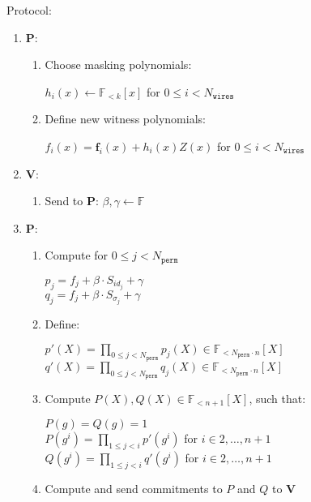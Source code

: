 Protocol:
\begin{enumerate}
	\item \textbf{P}:
	\begin{enumerate}
		\item Choose masking polynomials: 
		\begin{center}
			$h_i(x) \leftarrow \mathbb{F}_{<k}[x]$ for $0 \leq i < N_{\texttt{wires}}$
		\end{center}
		\item Define new witness polynomials:
		\begin{center}
			$f_i(x) = \textbf{f}_{i}(x) + h_i(x)Z(x)$ for $0 \leq i < N_{\texttt{wires}}$
		\end{center}
	\end{enumerate}
	\item \textbf{V}:
	\begin{enumerate}
		\item Send to \textbf{P}: $\beta, \gamma \leftarrow \mathbb{F}$
	\end{enumerate}
	\item \textbf{P}:
	\begin{enumerate}
		\item Compute for $0 \leq j < N_{\texttt{perm}}$
		\begin{center}
			$p_j = f_j + \beta \cdot S_{id_j} + \gamma$ \\
			$q_j = f_j + \beta \cdot S_{\sigma_j} + \gamma$
		\end{center}
		\item Define:
		\begin{center}
			$p'(X) = \prod\limits_{0 \leq j < N_{\texttt{perm}}} p_j(X) \in \mathbb{F}_{<N_{\texttt{perm}} \cdot n}[X]$ \\
			$q'(X) = \prod\limits_{0 \leq j < N_{\texttt{perm}}} q_j(X) \in \mathbb{F}_{<N_{\texttt{perm}} \cdot n}[X]$
		\end{center}
		\item Compute $P(X), Q(X) \in \mathbb{F}_{<n+1}[X]$, such that:
		\begin{center}
			$P(g) = Q(g) = 1$ \\
			$P(g^i) = \prod\limits_{1 \leq j < i}p'(g^i)$ for $i \in {2, \dots, n + 1}$ \\
			$Q(g^i) = \prod\limits_{1 \leq j < i}q'(g^i)$ for $i \in {2, \dots, n + 1}$ \\
		\end{center}
		\item Compute and send commitments to $P$ and $Q$ to \textbf{V}
	\end{enumerate}

\end{enumerate}
